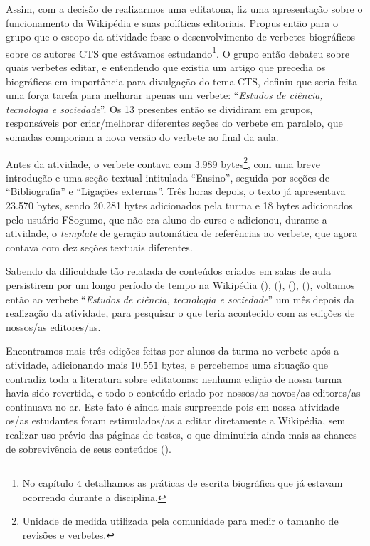 Assim, com a decisão de realizarmos uma editatona, fiz uma apresentação sobre o funcionamento da Wikipédia e suas políticas editoriais. Propus então para o grupo que o escopo da atividade fosse o desenvolvimento de verbetes biográficos sobre os autores CTS que estávamos estudando\footnote{No capítulo 4 detalhamos as práticas de escrita biográfica que já estavam ocorrendo durante a disciplina.}. O grupo então debateu sobre quais verbetes editar, e entendendo que existia um artigo que precedia os biográficos em importância para divulgação do tema CTS, definiu que seria feita uma força tarefa para melhorar apenas um verbete: ``\textit{Estudos de ciência, tecnologia e sociedade}''. Os 13 presentes então se dividiram em grupos, responsáveis por criar/melhorar diferentes seções do verbete em paralelo, que somadas comporiam a nova versão do verbete ao final da aula.

Antes da atividade, o verbete contava com 3.989 bytes\footnote{Unidade de medida utilizada pela comunidade para medir o tamanho de revisões e verbetes.}, com uma breve introdução e uma seção textual intitulada ``Ensino'', seguida por seções de ``Bibliografia'' e ``Ligações externas''. Três horas depois, o texto já apresentava 23.570 bytes, sendo 20.281 bytes adicionados pela turma e 18 bytes adicionados pelo usuário FSogumo, que não era aluno do curso e adicionou, durante a atividade, o \textit{template} de geração automática de referências ao verbete, que agora contava com dez seções textuais diferentes.

Sabendo da dificuldade tão relatada de conteúdos criados em salas de aula persistirem por um longo período de tempo na Wikipédia (\cite{marques_trabalhando_2012}), (\cite{carver_assigning_2012}), (\cite{archuby_experiencias_2018}), (\cite{soler-adillon_wikipedia_2018}), voltamos então ao verbete ``\textit{Estudos de ciência, tecnologia e sociedade}'' um mês depois da realização da atividade, para pesquisar o que teria acontecido com as edições de nossos/as editores/as.

Encontramos mais três edições feitas por alunos da turma no verbete após a atividade, adicionando mais 10.551 bytes, e percebemos uma situação que contradiz toda a literatura sobre editatonas: nenhuma edição de nossa turma havia sido revertida, e todo o conteúdo criado por nossos/as novos/as editores/as continuava no ar. Este fato é ainda mais surpreende pois em nossa atividade os/as estudantes foram estimulados/as a editar diretamente a Wikipédia, sem realizar uso prévio das páginas de testes, o que diminuiria ainda mais as chances de sobrevivência de seus conteúdos (\cite{marques_trabalhando_2012}).

